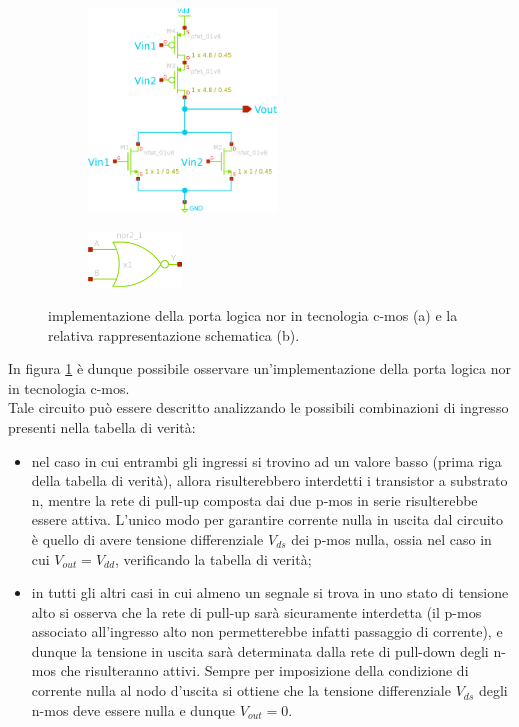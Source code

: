 	\begin{figure}[bht]
		\centering
		\begin{subfigure}{0.48\linewidth}
			\centering
			\includegraphics[width=5cm]{Immagini/nor-gate.eps} \caption{}			
		\end{subfigure}
		\begin{subfigure}{0.48\linewidth}
			\centering
			\includegraphics[width=2.5cm]{Immagini/nor-gate-simple.eps} \caption{}			
		\end{subfigure}
		\caption{implementazione della porta logica nor in tecnologia c-mos (a) e la relativa rappresentazione schematica (b).}
		\label{fig:nor:schematico}
	\end{figure}

	In figura \ref{fig:nor:schematico} è dunque possibile osservare un'implementazione della porta logica nor in tecnologia c-mos.\\
	Tale circuito può essere descritto analizzando le possibili combinazioni di ingresso presenti nella tabella di verità:
	\begin{itemize}
		\item nel caso in cui entrambi gli ingressi si trovino ad un valore basso (prima riga della tabella di verità), allora risulterebbero interdetti i transistor a substrato n, mentre la rete di pull-up composta dai due p-mos in serie risulterebbe essere attiva. L'unico modo per garantire corrente nulla in uscita dal circuito è quello di avere tensione differenziale $V_{ds}$ dei p-mos nulla, ossia nel caso in cui $V_{out} = V_{dd}$, verificando la tabella di verità;
		
		\item in tutti gli altri casi in cui almeno un segnale si trova in uno stato di tensione alto si osserva che la rete di pull-up sarà sicuramente interdetta (il p-mos associato all'ingresso alto non permetterebbe infatti passaggio di corrente), e dunque la tensione in uscita sarà determinata dalla rete di pull-down degli n-mos che risulteranno attivi. Sempre per imposizione della condizione di corrente nulla al nodo d'uscita si ottiene che la tensione differenziale $V_{ds}$ degli n-mos deve essere nulla e dunque $V_{out} = 0$.
	\end{itemize}
	
